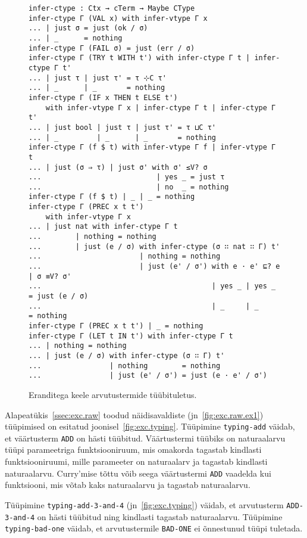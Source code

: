 \documentclass[a4paper,12pt]{article}
\begin{document}
\begin{figure}
  \begin{BVerbatim}
infer-ctype : Ctx → cTerm → Maybe CType
infer-ctype Γ (VAL x) with infer-vtype Γ x
... | just σ = just (ok / σ)
... | _      = nothing
infer-ctype Γ (FAIL σ) = just (err / σ)
infer-ctype Γ (TRY t WITH t') with infer-ctype Γ t | infer-ctype Γ t'
... | just τ | just τ' = τ ⊹C τ'
... | _      | _       = nothing
infer-ctype Γ (IF x THEN t ELSE t')
    with infer-vtype Γ x | infer-ctype Γ t | infer-ctype Γ t'
... | just bool | just τ | just τ' = τ ⊔C τ'
... | _         | _      | _       = nothing
infer-ctype Γ (f $ t) with infer-vtype Γ f | infer-vtype Γ t
... | just (σ ⇒ τ) | just σ' with σ' ≤V? σ
...                           | yes _ = just τ
...                           | no  _ = nothing
infer-ctype Γ (f $ t) | _ | _ = nothing
infer-ctype Γ (PREC x t t')
    with infer-vtype Γ x
... | just nat with infer-ctype Γ t
...        | nothing = nothing
...        | just (e / σ) with infer-ctype (σ ∷ nat ∷ Γ) t'
...                       | nothing = nothing
...                       | just (e' / σ') with e · e' ⊑? e | σ ≡V? σ'
...                                        | yes _ | yes _ = just (e / σ)
...                                        | _     | _     = nothing
infer-ctype Γ (PREC x t t') | _ = nothing
infer-ctype Γ (LET t IN t') with infer-ctype Γ t 
... | nothing = nothing
... | just (e / σ) with infer-ctype (σ ∷ Γ) t'
...                | nothing        = nothing
...                | just (e' / σ') = just (e · e' / σ')
  \end{BVerbatim}
  \caption{Eranditega keele arvutustermide tüübituletus.}
  \label{fig:exc.infer-ctype}
\end{figure}

Alapeatükis~\ref{ssec:exc.raw} toodud näidisavaldiste (jn~\ref{fig:exc.raw.ex1}) tüüpimised on esitatud joonisel~\ref{fig:exc.typing}.
Tüüpimine {\tt typing-add} väidab, et väärtusterm {\tt ADD} on hästi tüübitud. Väärtustermi tüübiks on naturaalarvu tüüpi parameetriga funktsiooniruum, mis omakorda tagastab kindlasti funktsiooniruumi, mille parameeter on naturaalarv ja tagastab kindlasti naturaalarvu. Curry'mise tõttu võib seega väärtustermi {\tt ADD} vaadelda kui funktsiooni, mis võtab kaks naturaalarvu ja tagastab naturaalarvu.

Tüüpimine {\tt typing-add-3-and-4} (jn~\ref{fig:exc.typing}) väidab, et arvutusterm {\tt ADD-3-and-4} on hästi tüübitud ning kindlasti tagastab naturaalarvu.
Tüüpimine {\tt typing-bad-one} väidab, et arvutustermile {\tt BAD-ONE} ei õnnestunud tüüpi tuletada.
\end{document}
